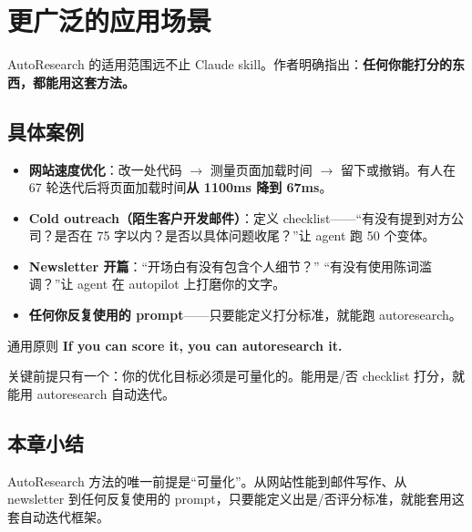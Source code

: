 \section{更广泛的应用场景}

AutoResearch 的适用范围远不止 Claude skill。作者明确指出：\textbf{任何你能打分的东西，都能用这套方法。}

\subsection{具体案例}

\begin{itemize}
    \item \textbf{网站速度优化}：改一处代码 $\to$ 测量页面加载时间 $\to$ 留下或撤销。有人在 67 轮迭代后将页面加载时间\textbf{从 1100ms 降到 67ms}。

    \item \textbf{Cold outreach（陌生客户开发邮件）}：定义 checklist——``有没有提到对方公司？是否在 75 字以内？是否以具体问题收尾？''让 agent 跑 50 个变体。

    \item \textbf{Newsletter 开篇}：``开场白有没有包含个人细节？'' ``有没有使用陈词滥调？''让 agent 在 autopilot 上打磨你的文字。

    \item \textbf{任何你反复使用的 prompt}——只要能定义打分标准，就能跑 autoresearch。
\end{itemize}

\begin{importantbox}{通用原则}
\textbf{If you can score it, you can autoresearch it.}

关键前提只有一个：你的优化目标必须是可量化的。能用是/否 checklist 打分，就能用 autoresearch 自动迭代。
\end{importantbox}

\subsection{本章小结}

AutoResearch 方法的唯一前提是``可量化''。从网站性能到邮件写作、从 newsletter 到任何反复使用的 prompt，只要能定义出是/否评分标准，就能套用这套自动迭代框架。

